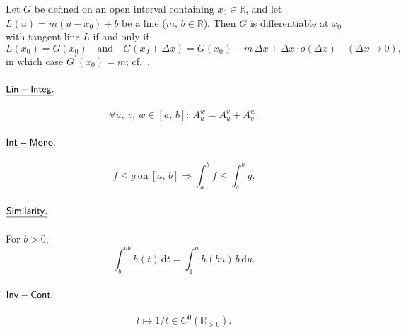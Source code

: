 \documentclass[11pt,reqno]{amsart}
\providecommand{\R}{\mathbb{R}}
\theoremstyle{redplain}
\begin{document}
Let $G$ be defined on an open interval containing $x_0\in\R$, and let $%
L(u)=m(u-x_0)+b$ be a line ($m,\,\allowbreak b\in\R$). Then $G$ is
differentiable at $x_0$ with tangent line $L$ if and only if 
\begin{equation}  \label{eq:little-o}
L(x_0)=G(x_0)\quad\text{and}\quad G(x_0+\Delta x)=G(x_0)+m\,\Delta x+\Delta
x\cdot o(\Delta x)\quad(\Delta x\to0),\,\allowbreak
\end{equation}
in which case $G^{\prime }(x_0)=m$; cf.\ \cite[Theorem~2]{Lopez2026}.

\paragraph{$\mathsf{\protect\underline{Lin-Integ.}}$}

\text{\ } 
\begin{equation}  \label{eq:lin-int}
\forall u,\,\allowbreak v,\,\allowbreak w\in[a,\,\allowbreak b]:\
A_u^w=A_u^v+A_v^w.
\end{equation}

\paragraph{$\mathsf{\protect\underline{Int-Mono.}}$}

\text{\ } 
\begin{equation}  \label{eq:int-mono}
f\le g\ \text{on}\ [a,\,\allowbreak b]\Rightarrow\int_a^b f\le\int_a^b g.
\end{equation}

\paragraph{$\mathsf{\protect\underline{Similarity.}}$}

\text{\ } For $b>0$,\,\allowbreak 
\begin{equation}  \label{eq:similarity}
\int_b^{ab} h(t)\,\mathrm{d}t=\int_1^a h(bu)\,b\,\mathrm{d}u.
\end{equation}

\paragraph{$\mathsf{\protect\underline{Inv-Cont.}}$}

\text{\ } 
\begin{equation}  \label{eq:inv-cont}
t\mapsto1/t\in C^0(\R_{>0}).
\end{equation}
\end{document}
